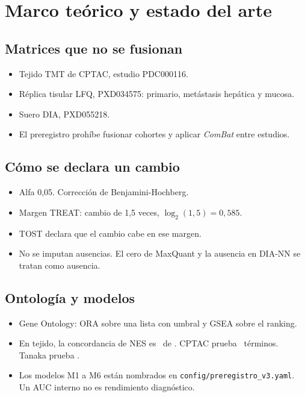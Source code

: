 \chapter{Marco teórico y estado del arte}

\section{Matrices que no se fusionan}
\begin{itemize}
\item Tejido TMT de CPTAC, estudio PDC000116. \cite{vasaikar2019,zhang2014}
\item Réplica tisular LFQ, PXD034575: primario, metástasis hepática y mucosa. \cite{tanaka2024}
\item Suero DIA, PXD055218. \cite{rai2025}
\item El preregistro prohíbe fusionar cohortes y aplicar \textit{ComBat} entre estudios.
\end{itemize}

\section{Cómo se declara un cambio}
\begin{itemize}
\item Alfa 0,05. Corrección de Benjamini-Hochberg. \cite{benjamini1995}
\item Margen TREAT: cambio de 1,5 veces, \(\log_2(1{,}5)=0{,}585\). \cite{mccarthy2009}
\item TOST declara que el cambio cabe en ese margen. \cite{lakens2017}
\item No se imputan ausencias. El cero de MaxQuant y la ausencia en DIA-NN se tratan como ausencia.
\end{itemize}

\section{Ontología y modelos}
\begin{itemize}
\item Gene Ontology: ORA sobre una lista con umbral y GSEA sobre el ranking. \cite{ashburner2000,subramanian2005}
\item En tejido, la concordancia de NES es \GoConNum\ de \GoConDen. CPTAC prueba \GoCptacTerminos\ términos. Tanaka prueba \GoTanakaTerminos.
\item Los modelos M1 a M6 están nombrados en \texttt{config/preregistro\_v3.yaml}. Un AUC interno no es rendimiento diagnóstico. \cite{pepe2001}
\end{itemize}

